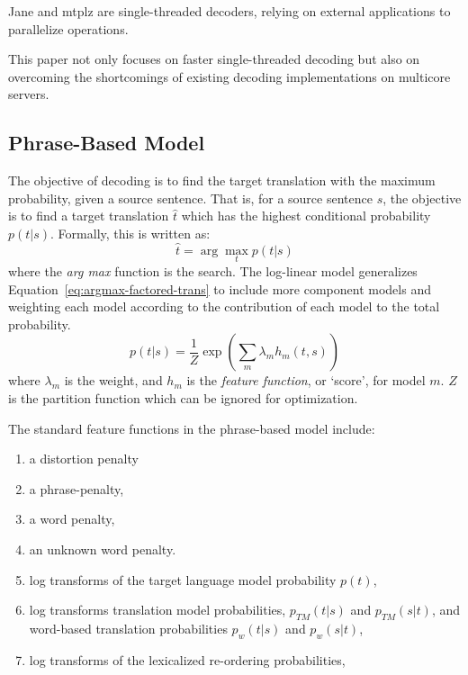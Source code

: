 \documentclass[]{article}
\begin{document}
Jane and mtplz are single-threaded decoders, relying on external applications to parallelize operations. %

This paper not only focuses on faster single-threaded decoding but also on overcoming the shortcomings of existing decoding implementations on multicore servers.

\subsection{Phrase-Based Model}

The objective of decoding is to find the target translation with the maximum probability, given a source sentence. That is, for a source sentence $s$, the objective is to find a target translation $\hat{t}$ which has the highest conditional probability $p(t | s)$. Formally, this is written as:
\begin{equation}
\hat{t} = \arg \max_t p( t | s )
\label{eq:argmax-factored-trans}
\end{equation}
where the \emph{arg max} function is the search. The log-linear model generalizes Equation~\ref{eq:argmax-factored-trans} to include more component models and weighting each model according to the contribution of each model to the total probability. 
\begin{equation}
\label{eq:Log-Linear}
p(t | s) 	=  \frac{1}{Z} \exp ( \sum_m \lambda_m h_m ( t, s)^{} )
\end{equation}
where $\lambda_m$ is the weight, and $h_m$ is the \emph{feature function}, or `score', for model $m$. $Z$ is the partition function which can be ignored for optimization. 

The standard feature functions in the phrase-based model include:
\begin{enumerate}
  \item \vspace{-2 mm} a distortion penalty
  \item \vspace{-2 mm} a phrase-penalty,
  \item \vspace{-2 mm} a word penalty,
  \item \vspace{-2 mm} an unknown word penalty.
  \item \vspace{-2 mm} log transforms of the target language model probability $p(t)$, 
  \item \vspace{-2 mm} log transforms translation model probabilities, $p_{TM}(t|s) $ and $p_{TM}(s|t)$, and word-based translation probabilities $p_w(t|s)$ and $p_w(s|t)$,
  \item \vspace{-2 mm} log transforms of the lexicalized re-ordering probabilities,
\end{enumerate}
\end{document}
